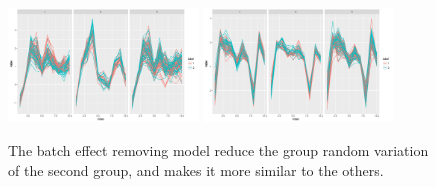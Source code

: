 \documentclass[simplex.tex]{subfiles}
\begin{document}
\begin{figure}[h!]
\begin{cframed}
\centering
\includegraphics[width=0.45\textwidth]{./figs/BE_not_removed_data}
\includegraphics[width=0.45\textwidth]{./figs/batch_removal_data}
\caption{The batch effect removing model reduce the group random variation of the second group, and makes it more similar to the others.}
\label{fig:arc}
\end{cframed}
\end{figure}
\end{document}
